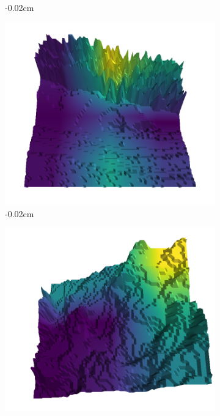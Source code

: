\documentclass[../document.tex]{subfiles}
\begin{document}
\begin{figure}[H]
\begin{subfigure}[b]{0.242\linewidth}
    \caption{-0.02cm}
    \end{subfigure}
    \begin{subfigure}[b]{0.242\linewidth}
    \includegraphics[width=\linewidth]{../img/5/quarry/worst/08-patch-3d-majavi-colormap-70.png}
    \caption{-0.02cm}
    \end{subfigure}
    \begin{subfigure}[b]{0.242\linewidth}
    \includegraphics[width=\linewidth]{../img/5/quarry/worst/09-patch-3d-majavi-colormap-75.png}

\end{subfigure}
\end{figure}
\end{document}

